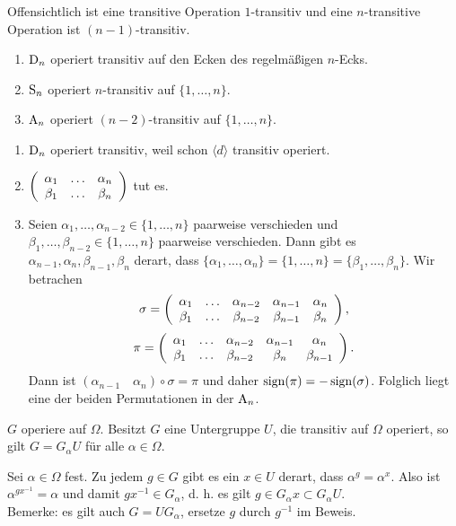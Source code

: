 \begin{beispiel}
 Offensichtlich ist eine transitive Operation $1$-transitiv und eine $n$-transitive Operation ist $(n-1)$-transitiv. 
\begin{enumerate}
 \item $\operatorname{D}_n$ operiert transitiv auf den Ecken des regelm\"a\ss{}igen $n$-Ecks.
 \item $\operatorname{S}_n$ operiert $n$-transitiv auf $\lbrace 1,\ldots,n\rbrace$.
 \item $\operatorname{A}_n$ operiert $(n-2)$-transitiv auf $\lbrace 1,\ldots,n\rbrace$.
\end{enumerate}

\end{beispiel}
\begin{beweis} \spspace
 \begin{enumerate}
  \item $\operatorname{D}_n$ operiert transitiv, weil schon $\langle d \rangle$ transitiv operiert.
  \item $\left(\begin{array}{ccc} \alpha_1&\ldots&\alpha_n\\\beta_1&\ldots&\beta_n\end{array}\right)$ tut es.
  \item Seien $\alpha_1,\ldots,\alpha_{n-2}\in \lbrace 1,\ldots,n \rbrace$ paarweise verschieden und $\beta_1,\ldots,\beta_{n-2} \in \lbrace 1,\ldots,n\rbrace$ paarweise verschieden. Dann gibt es $\alpha_{n-1},\alpha_n,\beta_{n-1},\beta_n$ derart, dass $\lbrace \alpha_1,\ldots,\alpha_n\rbrace=\lbrace 1,\ldots,n\rbrace=\lbrace\beta_1,\ldots,\beta_n\rbrace$. Wir betrachen $$\sigma=\left(\begin{array}{ccccc} \alpha_1&\ldots&\alpha_{n-2}&\alpha_{n-1}&\alpha_n\\\beta_1&\ldots&\beta_{n-2}&\beta_{n-1}&\beta_n\end{array}\right),$$ $$\pi=\left(\begin{array}{ccccc} \alpha_1&\ldots&\alpha_{n-2}&\alpha_{n-1}&\alpha_n\\\beta_1&\ldots&\beta_{n-2}&\beta_{n}&\beta_{n-1}\end{array}\right).$$
Dann ist $(\alpha_{n-1}\quad\alpha_n)\circ\sigma = \pi$ und daher $\operatorname{sign}(\pi)=-\operatorname{sign}(\sigma)$.
Folglich liegt eine der beiden Permutationen in der $\operatorname{A}_n$.
 \end{enumerate}

\end{beweis}

\begin{satz}
\label{5.22}
 $G$ operiere auf $\Omega$. Besitzt $G$ eine Untergruppe $U$, die transitiv auf $\Omega$ operiert, so gilt $G=G_\alpha U$ f\"ur alle $\alpha\in\Omega$.
\end{satz}
\begin{beweis}
 Sei $\alpha\in\Omega$ fest. Zu jedem $g\in G$ gibt es ein $x\in U$ derart, dass $\alpha^g=\alpha^x$. Also ist $\alpha^{gx^{-1}}=\alpha$ und damit $gx^{-1}\in G_\alpha$, d. h. es gilt $g\in G_\alpha x\subset G_\alpha U$.\\
Bemerke: es gilt auch $G=UG_\alpha$, ersetze $g$ durch $g^{-1}$ im Beweis.
\end{beweis}

